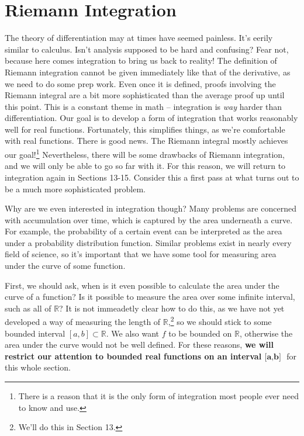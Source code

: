 \documentclass{article}
\newcommand{\R}{\mathbb{R}}
\theoremstyle{definition}
\begin{document}
	\section{Riemann Integration}
	The theory of differentiation may at times have seemed painless. It's eerily similar to calculus. Isn't analysis supposed to be hard and confusing? Fear not, because here comes integration to bring us back to reality! The definition of Riemann integration cannot be given immediately like that of the derivative, as we need to do some prep work. Even once it is defined, proofs involving the Riemann integral are a bit more sophisticated than the average proof up until this point. This is a constant theme in math -- integration is \textit{way} harder than differentiation. Our goal is to develop a form of integration that works reasonably well for real functions. Fortunately, this simplifies things, as we're comfortable with real functions. There is good news. The Riemann integral mostly achieves our goal!\footnote{There is a reason that it is the only form of integration most people ever need to know and use.} Nevertheless, there will be some drawbacks of Riemann integration, and we will only be able to go so far with it. For this reason, we will return to integration again in Sections 13-15. Consider this a first pass at what turns out to be a much more sophisticated problem. 
	
	Why are we even interested in integration though? Many problems are concerned with accumulation over time, which is captured by the area underneath a curve. For example, the probability of a certain event can be interpreted as the area under a probability distribution function. Similar problems exist in nearly every field of science, so it's important that we have some tool for measuring area under the curve of some function. 
	
	First, we should ask, when is it even possible to calculate the area under the curve of a function? Is it possible to measure the area over some infinite interval, such as all of $ \R $? It is not immeadetly clear how to do this, as we have not yet developed a way of measuring the length of $ \R $,\footnote{We'll do this in Section 13.} so we should stick to some bounded interval $ [a,b]\subset\R $. We also want $ f $ to be bounded on $ \R $, otherwise the area under the curve would not be well defined. For these reasons, \textbf{we will restrict our attention to bounded real functions on an interval $ \textbf{[a,b] }$} for this whole section. 
\end{document}
